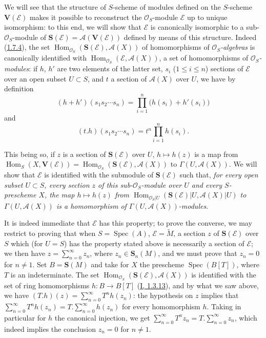 \begin{env}[1.7.14]
\label{II.1.7.14}
We will see that the structure of $S$-scheme of modules defined on the
$S$-scheme $\mathbf{V}(\mathcal{E})$ makes it possible to reconstruct the
$\mathcal{O}_S$-module $\mathcal{E}$ up to unique isomorphism: to this
end, we will show that $\mathcal{E}$ is canonically isomorphic to a
sub-$\mathcal{O}_S$-module of
$\mathbf{S}(\mathcal{E})=\mathcal{A}(\mathbf{V}(\mathcal{E}))$ defined by
means of this structure. Indeed
(\hyperref[II.1.7.4]{1.7.4}), the set
$\operatorname{Hom}_{\mathcal{O}_S}(\mathbf{S}(\mathcal{E}),
\mathcal{A}(X))$ of homomorphisms of
\emph{$\mathcal{O}_S$-algebras} is canonically identified with
$\operatorname{Hom}_{\mathcal{O}_S}(\mathcal{E},\mathcal{A}(X))$, a set
of homomorphisms of \emph{$\mathcal{O}_S$-modules}: if $h$, $h'$ are two
elements of the latter set, $s_i$ ($1\leq i\leq n$) sections of
$\mathcal{E}$ over an open subset $U\subset S$, and $t$ a section of
$\mathcal{A}(X)$ over $U$, we have by definition
\[
  (h+h')(s_1s_2\cdots s_n)
  =\prod_{i=1}^n\bigl(h(s_i)+h'(s_i)\bigr)
\]
and
\[
  (t.h)(s_1s_2\cdots s_n)=t^n\prod_{i=1}^n h(s_i).
\]

This being so, if $z$ is a section of $\mathbf{S}(\mathcal{E})$ over
$U$, $h\mapsto h(z)$ is a map from
$\operatorname{Hom}_S(X,\mathbf{V}(\mathcal{E}))
=\operatorname{Hom}_{\mathcal{O}_S}(\mathbf{S}(\mathcal{E}),
\mathcal{A}(X))$ to $\Gamma(U,\mathcal{A}(X))$. We will
show that $\mathcal{E}$ is identified with the submodule of
$\mathbf{S}(\mathcal{E})$ such that, \emph{for every open subset
$U\subset S$, every section $z$ of this sub-$\mathcal{O}_S$-module over $U$
and every $S$-prescheme $X$, the map $h\mapsto h(z)$ from
$\operatorname{Hom}_{\mathcal{O}_S|U}(\mathbf{S}(\mathcal{E})|U,
\mathcal{A}(X)|U)$ to $\Gamma(U,\mathcal{A}(X))$ is a homomorphism of
$\Gamma(U,\mathcal{A}(X))$-modules}.

It is indeed immediate that $\mathcal{E}$ has this property; to prove
the converse, we may restrict to proving that when
$S=\operatorname{Spec}(A)$, $\mathcal{E}=\widetilde{M}$, a section $z$ of
$\mathbf{S}(\mathcal{E})$ over $S$ which (for $U=S$) has the property
stated above is necessarily a section of
$\mathcal{E}$; we then have $z=\sum_{n=0}^{\infty}z_n$, where
$z_n\in\mathbf{S}_n(M)$, and we must prove that $z_n=0$ for $n\ne1$.
Set $B=\mathbf{S}(M)$ and take for $X$ the prescheme
$\operatorname{Spec}(B[T])$, where $T$ is an indeterminate. The set
$\operatorname{Hom}_{\mathcal{O}_S}(\mathbf{S}(\mathcal{E}),
\mathcal{A}(X))$ is identified with the set of ring homomorphisms
$h:B\to B[T]$ (\hyperref[I.1.3.13]{I, 1.3.13}), and by what we saw
above, we have
$(T.h)(z)=\sum_{n=0}^{\infty}T^nh(z_n)$: the hypothesis on $z$ implies
that
$\sum_{n=0}^{\infty}T^nh(z_n)=T.\sum_{n=0}^{\infty}h(z_n)$ for every
homomorphism $h$. Taking in particular for $h$ the canonical injection, we
get $\sum_{n=0}^{\infty}T^nz_n=T.\sum_{n=0}^{\infty}z_n$, which indeed
implies the conclusion $z_n=0$ for $n\ne1$.
\end{env}

